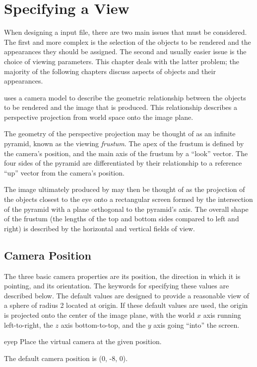 \chapter{Specifying a View}

When designing a {\rayshade} input file, there are two main
issues that must be considered.  The first and more complex
is the selection of the objects to be rendered and the appearances
they should be assigned.  The second and usually easier issue is
the choice of viewing parameters.  This chapter deals with the
latter problem; the majority of the following chapters
discuss aspects of objects and their appearances.

{\Rayshade} uses a camera model to describe
the geometric relationship between the objects to be rendered
and the image that is produced.  This relationship describes
a perspective projection from world space onto the image plane.

The geometry of the perspective projection
may be thought of as an
infinite pyramid, known as the viewing {\em frustum}.
The apex of the frustum is defined by the camera's position,
and the main axis of the frustum by a ``look'' vector.
The four sides of
the pyramid are differentiated by their relationship to a
reference ``up'' vector from the camera's position.

The image
ultimately produced by {\rayshade} may then be thought of as
the projection of the objects closest to the eye onto
a rectangular screen formed by the intersection of the pyramid with
a plane orthogonal to the pyramid's axis.  The overall shape
of the frustum (the lengths of the top and bottom sides compared
to left and right)
is described by the horizontal and vertical fields
of view.

\section{Camera Position}

The three basic camera properties are its position, the direction
in which it is pointing, and its orientation.  The keywords for
specifying these values are described below.
The default values
are designed to provide a reasonable view of a sphere of radius 2
located at origin.  If these default values are used,
the origin is projected onto the center of the image plane, with
the world $x$ axis  running left-to-right, the $z$ axis bottom-to-top,
and the $y$ axis going ``into'' the screen.

\begin{defkey}{eyep}{}
	Place the virtual camera at the given position.
\end{defkey}
The default camera position is (0, -8, 0).

